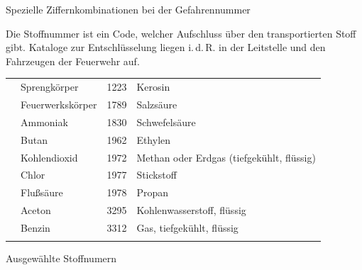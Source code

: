 {Spezielle Ziffernkombinationen bei der
Gefahrennummer\label{tab:gefahrennummer-spezielle-ziffernkombinationen}}
{}








{Die Stoffnummer ist ein Code, welcher Aufschluss über den
transportierten Stoff gibt. Kataloge zur Entschlüsselung
liegen i.\,d.\,R. in der Leitstelle und den Fahrzeugen der
Feuerwehr auf.

}
{}
{}
{}
{}


{}
{}
{
\begin{tabulary}{\linewidth}{cLcL}
\toprule{} & Sprengkörper & 1223 & Kerosin
\\ & Feuerwerkskörper & 1789 & Salzsäure
\\ & Ammoniak & 1830 & Schwefelsäure
\\ & Butan & 1962 & Ethylen
\\ & Kohlendioxid & 1972 & Methan oder Erdgas (tiefgekühlt, flüssig)
\\ & Chlor & 1977 & Stickstoff
\\ & Flußsäure & 1978 & Propan
\\ & Aceton & 3295 & Kohlenwasserstoff, flüssig
\\ & Benzin & 3312 & Gas, tiefgekühlt, flüssig
\\\addlinespace\bottomrule
\end{tabulary}
}
{Ausgewählte Stoffnumern}
{}









